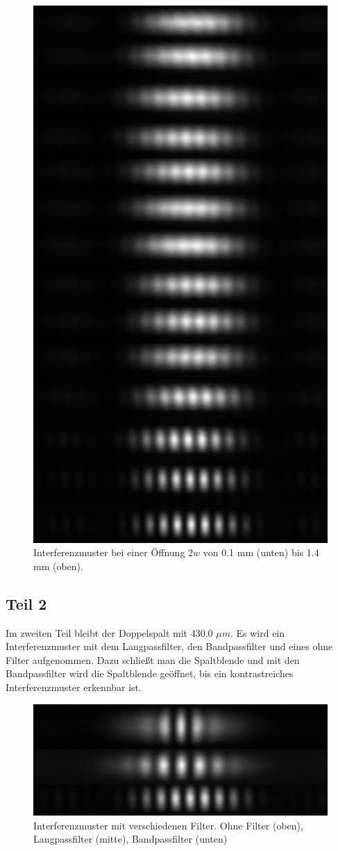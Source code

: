 \documentclass[12pt,a4paper,twoside]{article}
\begin{document}
\begin{figure}[H]
    \centering
    \includegraphics[width=0.7\linewidth]{nudes/aufgabe 1.jpg}
    \caption{Interferenzmuster bei einer Öffnung $2w$ von 0.1 mm (unten) bis 1.4 mm (oben). }
    \label{fig:aufgabe 1}
\end{figure}

\subsection{Teil 2}
Im zweiten Teil bleibt der Doppelspalt mit 430.0 $\mu m$. Es wird ein Interferenzmuster mit dem Langpassfilter, den Bandpassfilter und eines ohne Filter aufgenommen. 
Dazu schließt man die Spaltblende und mit den Bandpassfilter wird die Spaltblende geöffnet, bis ein kontrastreiches Interferenzmuster erkennbar ist. 

\begin{figure}[H]
    \centering
    \includegraphics[width=0.7\linewidth]{nudes/aufgabe 2.jpg}
    \caption{Interferenzmuster mit verschiedenen Filter. Ohne Filter (oben), Langpassfilter (mitte), Bandpassfilter (unten) }
    \label{fig:aufgabe 2}
\end{figure}
\end{document}
